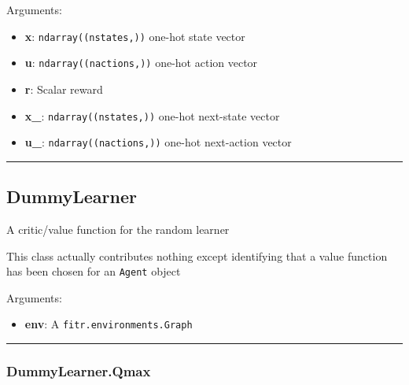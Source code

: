 Arguments:

\begin{itemize}
\tightlist
\item
  \textbf{x}: \texttt{ndarray((nstates,))} one-hot state vector
\item
  \textbf{u}: \texttt{ndarray((nactions,))} one-hot action vector
\item
  \textbf{r}: Scalar reward
\item
  \textbf{x\_}: \texttt{ndarray((nstates,))} one-hot next-state vector
\item
  \textbf{u\_}: \texttt{ndarray((nactions,))} one-hot next-action vector
\end{itemize}

\begin{center}\rule{0.5\linewidth}{\linethickness}\end{center}

\subsection{DummyLearner}\label{dummylearner}

\begin{Shaded}
\begin{Highlighting}[]
\end{Highlighting}
\end{Shaded}

A critic/value function for the random learner

This class actually contributes nothing except identifying that a value
function has been chosen for an \texttt{Agent} object

Arguments:

\begin{itemize}
\tightlist
\item
  \textbf{env}: A \texttt{fitr.environments.Graph}
\end{itemize}

\begin{center}\rule{0.5\linewidth}{\linethickness}\end{center}

\subsubsection{DummyLearner.Qmax}\label{dummylearner.qmax}

\begin{Shaded}
\begin{Highlighting}[]
\end{Highlighting}
\end{Shaded}

